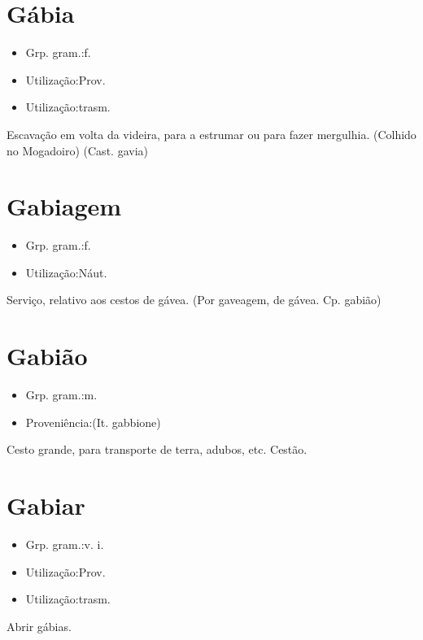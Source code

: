 \section{Gábia}
\begin{itemize}
\item {Grp. gram.:f.}
\end{itemize}
\begin{itemize}
\item {Utilização:Prov.}
\end{itemize}
\begin{itemize}
\item {Utilização:trasm.}
\end{itemize}
Escavação em volta da videira, para a estrumar ou para fazer mergulhia. (Colhido no Mogadoiro)
(Cast. \textunderscore gavia\textunderscore )
\section{Gabiagem}
\begin{itemize}
\item {Grp. gram.:f.}
\end{itemize}
\begin{itemize}
\item {Utilização:Náut.}
\end{itemize}
Serviço, relativo aos cestos de gávea.
(Por \textunderscore gaveagem\textunderscore , de \textunderscore gávea\textunderscore . Cp. \textunderscore gabião\textunderscore )
\section{Gabião}
\begin{itemize}
\item {Grp. gram.:m.}
\end{itemize}
\begin{itemize}
\item {Proveniência:(It. \textunderscore gabbione\textunderscore )}
\end{itemize}
Cesto grande, para transporte de terra, adubos, etc.
Cestão.
\section{Gabiar}
\begin{itemize}
\item {Grp. gram.:v. i.}
\end{itemize}
\begin{itemize}
\item {Utilização:Prov.}
\end{itemize}
\begin{itemize}
\item {Utilização:trasm.}
\end{itemize}
Abrir gábias.
